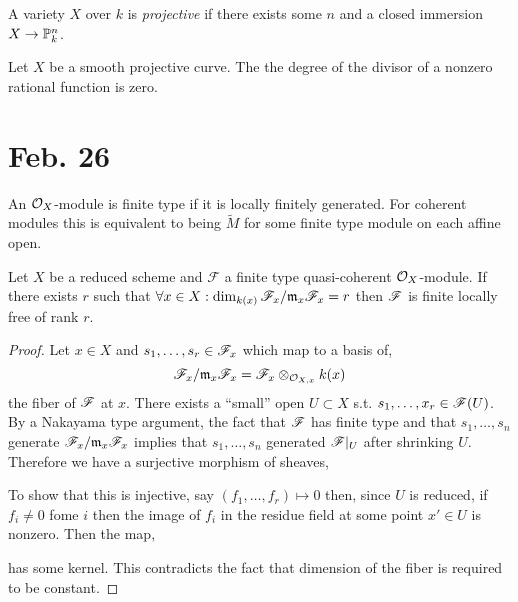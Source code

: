 \documentclass[12pt]{article}
\begin{document}
\begin{definition}
A variety $X$ over $k$ is \textit{projective} if there exists some $n$ and a closed immersion $X \to \P^n_k$.
\end{definition}

\begin{proposition}
Let $X$ be a smooth projective curve. The the degree of the divisor of a nonzero rational function is zero. 
\end{proposition}

\section{Feb. 26}

\begin{definition}
An $\struct{X}$-module is finite type if it is locally finitely generated. For coherent modules this is equivalent to being $\widetilde{M}$ for some finite type module on each affine open.
\end{definition}

\begin{proposition}
Let $X$ be a reduced scheme and $\mathcal{F}$ a finite type quasi-coherent $\struct{X}$-module. If there exists $r$ such that $\forall x \in X : \dim_{k(x)} \F_x / \m_x \F_x = r$ then $\F$ is finite locally free of rank $r$.  
\end{proposition}

\begin{proof}
Let $x \in X$ and $s_1, \dots, s_r \in \F_x$ which map to a basis of,
\[ \F_x / \m_x \F_x = \F_x \otimes_{\stalk{X}{x}} k(x) \]
the fiber of $\F$ at $x$. There exists a ``small'' open $U \subset X$ s.t. $s_1, \dots, x_r \in \F(U)$. By a Nakayama type argument, the fact that $\F$ has finite type and that $s_1, \dots, s_n$ generate $\F_x / \m_x \F_x$ implies that $s_1, \dots, s_n$ generated $\F |_U$ after shrinking $U$. Therefore we have a surjective morphism of sheaves,
\begin{center}
\end{center} 
To show that this is injective, say $(f_1, \dots, f_r) \mapsto 0$ then, since $U$ is reduced, if $f_i \neq 0$ fome $i$ then the image of $f_i$ in the residue field at some point $x' \in U$ is nonzero. Then the map,
\begin{center}
\end{center}
has some kernel. This contradicts the fact that dimension of the fiber is required to be constant. 
\end{proof}
\end{document}
